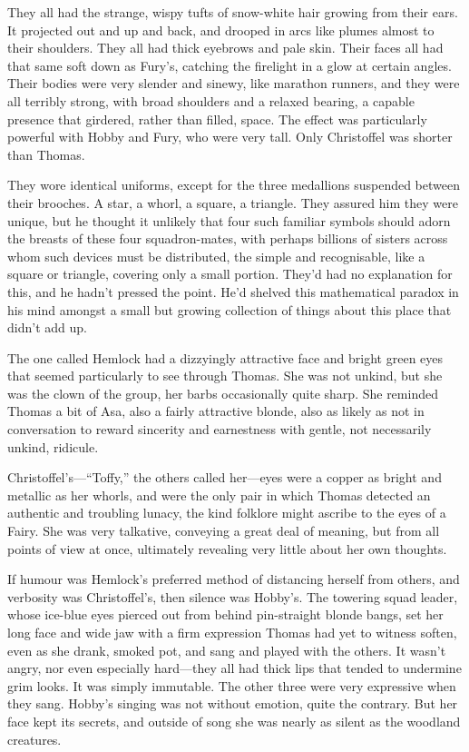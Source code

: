 \documentclass[11pt,a5paper]{article}
\begin{document}
They all had the strange, wispy tufts of snow-white hair growing from their ears. It projected out and up and back, and drooped in arcs like plumes almost to their shoulders. They all had thick eyebrows and pale skin. Their faces all had that same soft down as Fury's, catching the firelight in a glow at certain angles. Their bodies were very slender and sinewy, like marathon runners, and they were all terribly strong, with broad shoulders and a relaxed bearing, a capable presence that girdered, rather than filled, space. The effect was particularly powerful with Hobby and Fury, who were very tall. Only Christoffel was shorter than Thomas.

They wore identical uniforms, except for the three medallions suspended between their brooches. A star, a whorl, a square, a triangle. They assured him they were unique, but he thought it unlikely that four such familiar symbols should adorn the breasts of these four squadron-mates, with perhaps billions of sisters across whom such devices must be distributed, the simple and recognisable, like a square or triangle, covering only a small portion. They'd had no explanation for this, and he hadn't pressed the point. He'd shelved this mathematical paradox in his mind amongst a small but growing collection of things about this place that didn't add up.

The one called Hemlock had a dizzyingly attractive face and bright green eyes that seemed particularly to see through Thomas. She was not unkind, but she was the clown of the group, her barbs occasionally quite sharp. She reminded Thomas a bit of Asa, also a fairly attractive blonde, also as likely as not in conversation to reward sincerity and earnestness with gentle, not necessarily unkind, ridicule.

Christoffel's---``Toffy,'' the others called her---eyes were a copper as bright and metallic as her whorls, and were the only pair in which Thomas detected an authentic and troubling lunacy, the kind folklore might ascribe to the eyes of a Fairy. She was very talkative, conveying a great deal of meaning, but from all points of view at once, ultimately revealing very little about her own thoughts.

If humour was Hemlock's preferred method of distancing herself from others, and verbosity was Christoffel's, then silence was Hobby's. The towering squad leader, whose ice-blue eyes pierced out from behind pin-straight blonde bangs, set her long face and wide jaw with a firm expression Thomas had yet to witness soften, even as she drank, smoked pot, and sang and played with the others. It wasn't angry, nor even especially hard---they all had thick lips that tended to undermine grim looks. It was simply immutable. The other three were very expressive when they sang. Hobby's singing was not without emotion, quite the contrary. But her face kept its secrets, and outside of song she was nearly as silent as the woodland creatures.
\end{document}
